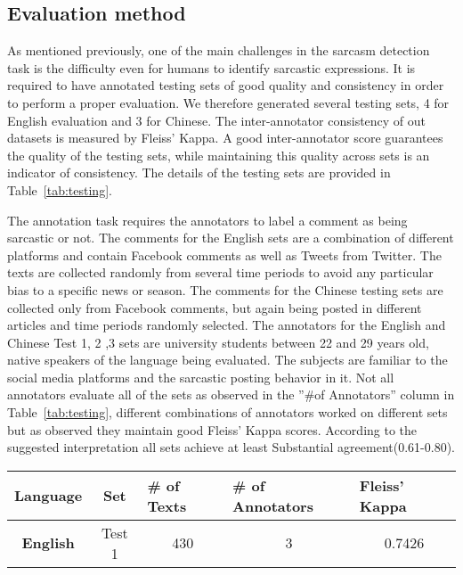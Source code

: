 \documentclass[12pt,a4paper]{report}
\theoremstyle{definition}
\begin{document}
\begin{CJK}{UTF8}{bsmi}
    \subsection{Evaluation method}
    \par As mentioned previously, one of the main challenges in the sarcasm detection task is the difficulty even for humans to identify sarcastic expressions. It is required to have annotated testing sets of good quality and consistency in order to perform a proper evaluation. We therefore generated several testing sets, 4 for English evaluation and 3 for Chinese. The inter-annotator consistency of out datasets is measured by Fleiss' Kappa. A good inter-annotator score guarantees the quality of the testing sets, while maintaining this quality across sets is an indicator of consistency. The details of the testing sets are provided in Table~\ref{tab:testing}.
    \par The annotation task requires the annotators to label a comment as being sarcastic or not. The comments for the English sets are a combination of different platforms and contain Facebook comments as well as Tweets from Twitter. The texts are collected randomly from several time periods to avoid any particular bias to a specific news or season. The comments for the Chinese testing sets are collected only from Facebook comments, but again being posted in different articles and time periods randomly selected. The annotators for the English and Chinese Test 1, 2 ,3 sets are university students between 22 and 29 years old, native speakers of the language being evaluated. The subjects are familiar to the social media platforms and the sarcastic posting behavior in it. Not all annotators evaluate all of the sets as observed in the ”\#of Annotators” column in Table~\ref{tab:testing}, different combinations of annotators worked on different sets but as observed they maintain good Fleiss' Kappa scores. According to the suggested interpretation all sets achieve at least Substantial agreement(0.61-0.80).
    \renewcommand\tabcolsep{2pt}
\begin{table}[H]
\centering
\begin{tabular}{l|c|c|c|c}
\hline
{\textbf{Language}}                                      & \multicolumn{1}{c|}{\textbf{Set}} & \multicolumn{1}{l|}{\textbf{\# of Texts}} & \multicolumn{1}{l|}{\textbf{\# of Annotators}} & \multicolumn{1}{l}{\textbf{Fleiss' Kappa}} \\ \hline
\multicolumn{1}{c|}{\textbf{English}} & Test 1                           & 430                                 & 3                                     & 0.7426                            \\

\end{tabular}
\end{table}
\end{CJK}
\end{document}

